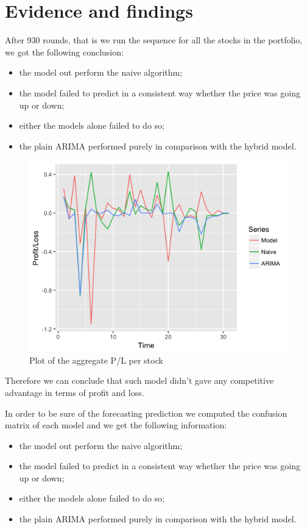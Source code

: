 \documentclass[twocolumn]{article}
\begin{document}
\begin{tikzpicture}

\end{tikzpicture}


\section{Evidence and findings}
After 930 rounds, that is we run the sequence for all the stocks in the portfolio, we got the following conclusion:
\begin{itemize}
    \item the model out perform the naive algorithm;
    \item the model failed to predict in a consistent way whether the price was going up or down;
    \item either the models alone failed to do so;
    \item the plain ARIMA performed purely in comparison with the hybrid model.
\end{itemize}

\begin{figure}
    \centering
    \includegraphics[width=1\linewidth, ]{Paper/images/PL_plot.png}
    \caption{Plot of the aggregate P/L per stock}
    \label{pl_portfolio}
\end{figure}

Therefore we can conclude that such model didn't gave any competitive advantage in terms of profit and loss.

In order to be sure of the forecasting prediction we computed the confusion matrix of each model and we get the following information:
\begin{itemize}
    \item the model out perform the naive algorithm;
    \item the model failed to predict in a consistent way whether the price was going up or down;
    \item either the models alone failed to do so;
    \item the plain ARIMA performed purely in comparison with the hybrid model.
\end{itemize}
\end{document}
